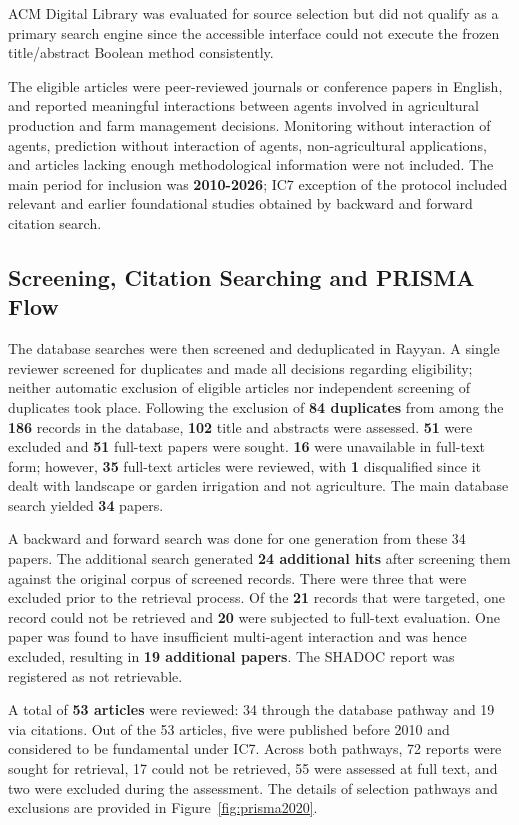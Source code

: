 \documentclass[11pt,a4paper]{article}
\begin{document}
ACM Digital Library was evaluated for source selection but did not qualify as a primary search engine since the accessible interface could not execute the frozen title/abstract Boolean method consistently.

The eligible articles were peer-reviewed journals or conference papers in English, and reported meaningful interactions between agents involved in agricultural production and farm management decisions. Monitoring without interaction of agents, prediction without interaction of agents, non-agricultural applications, and articles lacking enough methodological information were not included. The main period for inclusion was \textbf{2010-2026}; IC7 exception of the protocol included relevant and earlier foundational studies obtained by backward and forward citation search.


\subsection{Screening, Citation Searching and PRISMA Flow}

The database searches were then screened and deduplicated in Rayyan. A single reviewer screened for duplicates and made all decisions regarding eligibility; neither automatic exclusion of eligible articles nor independent screening of duplicates took place. Following the exclusion of \textbf{84 duplicates} from among the \textbf{186} records in the database, \textbf{102} title and abstracts were assessed. \textbf{51} were excluded and \textbf{51} full-text papers were sought. \textbf{16} were unavailable in full-text form; however,
\textbf{35} full-text articles were reviewed, with \textbf{1} disqualified since it dealt with landscape or garden irrigation and not agriculture. The main database search yielded \textbf{34} papers.

A backward and forward search was done for one generation from these 34 papers. The additional search generated \textbf{24 additional hits} after screening them against the original corpus of screened records. There were three that were excluded prior to the retrieval process. Of the \textbf{21} records that were targeted, one record could not be retrieved and \textbf{20} were subjected to full-text evaluation. One paper was found to have insufficient multi-agent interaction and was hence excluded, resulting in \textbf{19 additional papers}. The SHADOC report was registered as not retrievable.

A total of \textbf{53 articles} were reviewed: 34 through the database pathway and 19 via citations. Out of the 53 articles, five were published before 2010 and considered to be fundamental under IC7. Across both pathways, 72 reports were sought for retrieval, 17 could not be retrieved, 55 were assessed at full text, and two were excluded during the assessment. The details of selection pathways and exclusions are provided in Figure~\ref{fig:prisma2020}.
\end{document}
